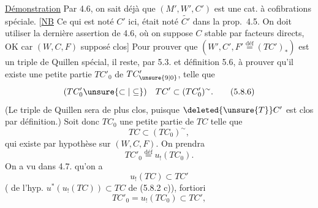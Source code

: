 
\uline{Démonstration} Par 4.6, on sait déjà que
$(M',W',C')$ est une cat. à cofibrations spéciale.
[\uline{NB} Ce qui est noté $C'$ ici, était noté $\widetilde{C'}$ dans
la prop.~4.5. On doit utiliser la dernière
assertion de 4.6, où on suppose $C$ stable par
facteurs directs, OK car $(W,C,F)$ supposé
clos] Pour prouver que $(W',C',F'\overset{\mathrm{déf}}=(TC')_{*})$
est un triple de Quillen spécial, il
reste, par 5.3. et définition 5.6, à prouver
qu'il existe une petite partie $TC'_{0}$ de
$TC'_{\unsure{9|0}}$, telle que
\[
 (TC'_{0}\unsure{\subset|\subseteq})\quad TC'\subset (TC'_{0})^{\sim}. \tag*{(5.8.6)}
\]
(Le triple de Quillen sera de plus clos, puisque
$\deleted{\unsure{T}}C'$ est clos  par définition.) Soit donc
$TC_{0}$ une petite partie de $TC$ telle que
\[
 TC\subset (TC_{0})^{\sim},\tag*{(5.8.7)}
\]
qui existe par hypothèse sur $(W,C,F)$. On
prendra
\[
 TC'_{0}\overset{\mathrm{déf}}=u_{!}(TC_{0}).\tag*{(5.8.8)}
\]
On a vu dans 4.7. qu'on a
\[
 u_{!}(TC)\subset TC'\tag*{(5.8.9)}
\]
( de l'hyp. $u^{*}(u_{!}(TC))\subset TC$
de (5.8.2 c)),  fortiori
\[
 TC'_{0}=u_{!}(TC_{0})\subset TC',
\]

